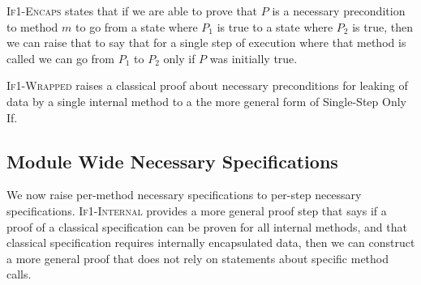 \textsc{If1-Encaps} states that if we are able to prove that $P$ is 
a necessary precondition to method $m$ to go from a state where 
$P_1$ is true to a state where $P_2$ is true, then we can raise 
that to say that for a single step of execution where that method 
is called we can go from $P_1$ to $P_2$ only if $P$ was initially true.

\textsc{If1-Wrapped} raises a classical proof about necessary preconditions 
for leaking of data by a single internal method to a the more general form of 
Single-Step Only If.

\subsection{Module Wide Necessary Specifications}
\label{s:module-proof}

We now raise per-method necessary specifications 
to per-step necessary specifications. \textsc{If1-Internal} provides a more general proof step that says
if a proof of a classical specification can be proven for all internal 
methods, and that classical specification requires internally encapsulated
data, then we can construct a more general proof that does not rely on
statements about specific method calls.

